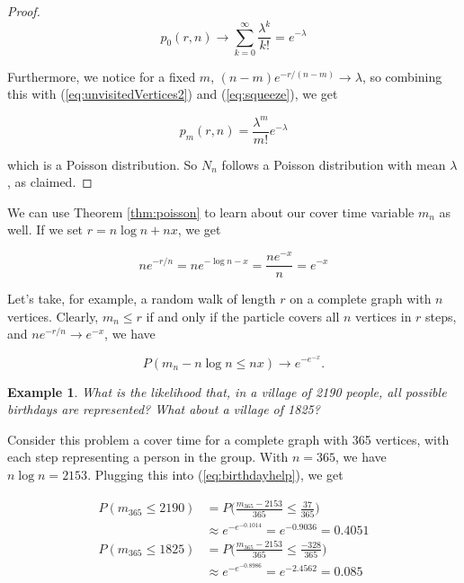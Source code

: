 \documentclass[11pt]{article}
\newtheorem{exa}[thm]{Example}
\begin{document}
\begin{proof}
\begin{equation}
p_{0}(r,n) \to \sum_{k = 0}^{\infty} \frac{\lambda^{k}}{k!} = e^{-\lambda}
\end{equation}

Furthermore, we notice for a fixed $m$, $(n - m)e^{-r/(n-m)} \to \lambda$, so combining this with (\ref{eq:unvisitedVertices2}) and (\ref{eq:squeeze}), we get

\begin{equation}
p_{m}(r, n) = \frac{\lambda^{m}}{m!}e^{-\lambda}
\end{equation}

\noindent which is a Poisson distribution. So $N_{n}$ follows a Poisson distribution with mean $\lambda$, as claimed. 

\end{proof}

We can use Theorem \ref{thm:poisson} to learn about our cover time variable $m_{n}$ as well. If we set $r = n\log{n} + nx$, we get

\begin{equation}
ne^{-r/n} = ne^{-\log{n} - x} = \frac{ne^{-x}}{n} = e^{-x}
\end{equation}

Let's take, for example, a random walk of length $r$ on a complete graph with $n$ vertices. Clearly, $m_{n} \le r$ if and only if the particle covers all $n$ vertices in $r$ steps, and $ne^{-r/n} \to e^{-x}$, we have

\begin{equation}
P(m_{n} - n\log{n} \le nx) \to e^{-e^{-x}}.
\label{eq:birthdayhelp}
\end{equation}

\begin{exa}
What is the likelihood that, in a village of 2190 people, all possible birthdays are represented? What about a village of 1825?
\end{exa}
Consider this problem a cover time for a complete graph with 365 vertices, with each step representing a person in the group. With $n = 365$, we have $n\log{n} = 2153$. Plugging this into (\ref{eq:birthdayhelp}), we get

\begin{align*}
P(m_{365} \le 2190) &= P\bigg(\frac{m_{365} - 2153}{365} \le \frac{37}{365}\bigg) \\
&\approx e^{-e^{-0.1014}} = e^{-0.9036} = 0.4051 \\
P(m_{365} \le 1825) &= P\bigg(\frac{m_{365} - 2153}{365} \le \frac{-328}{365}\bigg) \\
&\approx e^{-e^{-0.8986}} = e^{-2.4562} = 0.085 
\end{align*}
\end{document}
